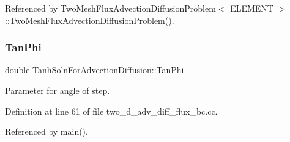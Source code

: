 Referenced by Two\+Mesh\+Flux\+Advection\+Diffusion\+Problem$<$ E\+L\+E\+M\+E\+N\+T $>$\+::\+Two\+Mesh\+Flux\+Advection\+Diffusion\+Problem().

\mbox{\label{namespaceTanhSolnForAdvectionDiffusion_a236bf82c661189623706b7c9d9b0c52f}} 
\subsubsection{\texorpdfstring{Tan\+Phi}{TanPhi}}
{\footnotesize\ttfamily double Tanh\+Soln\+For\+Advection\+Diffusion\+::\+Tan\+Phi}



Parameter for angle of step. 



Definition at line 61 of file two\+\_\+d\+\_\+adv\+\_\+diff\+\_\+flux\+\_\+bc.\+cc.



Referenced by main().

